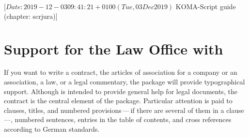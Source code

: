 %
%
%
%
%
%
%
%
% 
%
%
%
%

%
                 [$Date: 2019-12-03 09:41:21 +0100 (Tue, 03 Dec 2019) $
                  KOMA-Script guide (chapter: scrjura)]



\chapter{Support for the Law Office with }
\BeginIndexGroup
{}

If you want to write a contract, the articles of association
for a company or an association, a law, or a legal commentary, the package
 will provide typographical support. Although
 is intended to provide general help for legal documents, the
contract is the central element of the package. Particular attention is paid
to clauses, titles, and numbered provisions\,---\,if there are several of
them in a clause\,---, numbered sentences, entries in the table of
contents, and cross references according to German standards.

